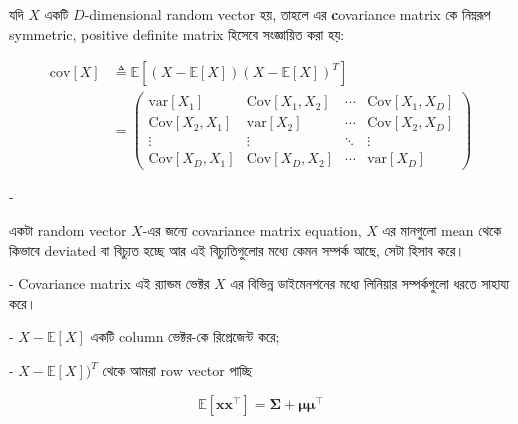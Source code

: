 \documentclass[graybox, envcountchap, twocolumn]{styles/svmult}
\begin{document}
\begin{definition}
{\bengalifont যদি $X$ একটি $D$-dimensional random vector হয়, তাহলে এর {\textbf covariance matrix} কে নিম্নরূপ symmetric, positive definite matrix হিসেবে সংজ্ঞায়িত করা হয়:}

\begin{align}
\mathrm{cov}[X] & \triangleq \mathbb{E}\left[(X-\mathbb{E}[X])(X-\mathbb{E}[X])^T\right] \\
       &  = \left( \begin{array}{cccc}
           \text{var}[X_1] & \text{Cov}[X_1,X_2] & \cdots & \text{Cov}[X_1,X_D] \\
           \text{Cov}[X_2,X_1] & \text{var}[X_2] & \cdots & \text{Cov}[X_2,X_D] \\
		   \vdots & \vdots & \ddots & \vdots \\
           \text{Cov}[X_D,X_1] & \text{Cov}[X_D,X_2] & \cdots & \text{var}[X_D] \end{array} \right)
\end{align}



-  {\bengalifont একটা random vector $X$-এর জন্যে covariance matrix equation, $X$ এর মানগুলো mean থেকে কিভাবে deviated বা বিচ্যুত হচ্ছে আর এই বিচ্যুতিগুলোর মধ্যে কেমন সম্পর্ক আছে, সেটা হিসাব করে।  

- Covariance matrix এই র‍্যান্ডম ভেক্টর $X$ এর বিভিন্ন ডাইমেনশনের মধ্যে লিনিয়ার সম্পর্কগুলো ধরতে সাহায্য করে।

- $X-\mathbb{E}[X]$ একটি column ভেক্টর-কে রিপ্রেজেন্ট করে; 

- $X-\mathbb{E}[X])^T$ থেকে আমরা row vector পাচ্ছি }
\[
\mathbb{E}[\mathbf{x} \mathbf{x}^\top] = \mathbf{\Sigma} + \boldsymbol{\mu} \boldsymbol{\mu}^\top
\]

\end{definition}
\end{document}
